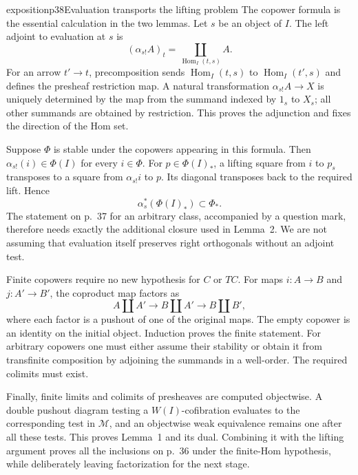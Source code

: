 \begin{dcomment}{exposition}{p38}{Evaluation transports the lifting problem}
The copower formula is the essential calculation in the two lemmas. Let $s$ be an object of $I$. The left adjoint to evaluation at $s$ is
\[
 (\alpha_{s!}A)_t=\coprod_{\operatorname{Hom}_I(t,s)}A.
\]
For an arrow $t'\to t$, precomposition sends $\operatorname{Hom}_I(t,s)$ to $\operatorname{Hom}_I(t',s)$ and defines the presheaf restriction map. A natural transformation $\alpha_{s!}A\to X$ is uniquely determined by the map from the summand indexed by $1_s$ to $X_s$; all other summands are obtained by restriction. This proves the adjunction and fixes the direction of the Hom set.

Suppose $\Phi$ is stable under the copowers appearing in this formula. Then $\alpha_{s!}(i)\in\Phi(I)$ for every $i\in\Phi$. For $p\in\Phi(I)_*$, a lifting square from $i$ to $p_s$ transposes to a square from $\alpha_{s!}i$ to $p$. Its diagonal transposes back to the required lift. Hence
\[
 \alpha_s^*(\Phi(I)_*)\subset\Phi_*.
\]
The statement on p.~37 for an arbitrary class, accompanied by a question mark, therefore needs exactly the additional closure used in Lemma~2. We are not assuming that evaluation itself preserves right orthogonals without an adjoint test.

Finite copowers require no new hypothesis for $C$ or $TC$. For maps $i:A\to B$ and $j:A'\to B'$, the coproduct map factors as
\[
 A\amalg A'\longrightarrow B\amalg A'\longrightarrow B\amalg B',
\]
where each factor is a pushout of one of the original maps. The empty copower is an identity on the initial object. Induction proves the finite statement. For arbitrary copowers one must either assume their stability or obtain it from transfinite composition by adjoining the summands in a well-order. The required colimits must exist.

Finally, finite limits and colimits of presheaves are computed objectwise. A double pushout diagram testing a $W(I)$-cofibration evaluates to the corresponding test in $\mathcal M$, and an objectwise weak equivalence remains one after all these tests. This proves Lemma~1 and its dual. Combining it with the lifting argument proves all the inclusions on p.~36 under the finite-Hom hypothesis, while deliberately leaving factorization for the next stage.
\end{dcomment}

